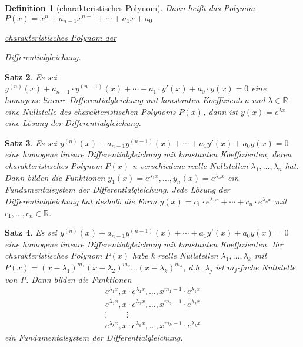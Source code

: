 \documentclass[fontset=ubuntu,11pt,a4paper,fleqn,headsepline]{scrreprt}
\newtheorem{defi}{Definition}[section]
\newtheorem{satz}[defi]{Satz}
\begin{document}
\begin{multicols}{2}
\begin{defi}[charakteristisches Polynom]
            Dann heißt das Polynom \(P(x)=x^n+a_{n-1}x^{n-1}+\cdots+a_1x+a_0\)
            
            \underline{charakteristisches Polynom der}
            
            \underline{Differentialgleichung}.
        \end{defi}
    
        \begin{satz}
            Es sei \(y^{(n)}(x) + a_{n-1} \cdot y^{(n-1)}(x) + \cdots + a_1 \cdot y'(x) + a_0 \cdot y(x) = 0\) eine homogene lineare Differentialgleichung mit konstanten Koeffizienten und \(\lambda \in\mathbb{R}\) eine Nullstelle des charakteristischen Polynoms \(P(x)\), dann ist \(y(x)=e^{\lambda x}\) eine Lösung der Differentialgleichung.
        \end{satz}
    
        \begin{satz}
            Es sei \(y^{(n)}(x) + a_{n-1} y^{(n-1)}(x) + \cdots + a_1 y'(x) + a_0 y(x) = 0\) eine homogene lineare Differentialgleichung mit konstanten Koeffizienten, deren charakteristisches Polynom \(P(x)\) n verschiedene reelle Nullstellen \(\lambda_1,\dots,\lambda_n\) hat. Dann bilden die Funktionen \(y_1(x)=e^{\lambda_1 x},\dots,y_n(x)=e^{\lambda_n x}\) ein Fundamentalsystem der Differentialgleichung. Jede Lösung der Differentialgleichung hat deshalb die Form \(y(x)=c_1 \cdot e^{\lambda_1 x} + \cdots + c_n \cdot e^{\lambda_n x}\) mit \(c_1,\dots,c_n \in \mathbb{R}\).
        \end{satz}
    
        \begin{satz}
            Es sei \(y^{(n)}(x) + a_{n-1} y^{(n-1)}(x) + \cdots + a_1 y'(x) + a_0 y(x) = 0\) eine homogene lineare Differentialgleichung mit konstanten Koeffizienten. Ihr charakteristisches Polynom \(P(x)\) habe k reelle Nullstellen \(\lambda_1,\dots,\lambda_k\) mit \(P(x)={(x-\lambda_1)}^{m_1}{(x-\lambda_2)}^{m_2} \dots {(x-\lambda_k)}^{m_k}\), d.h. \(\lambda_j\) ist \(m_j\)-fache Nullstelle von P. Dann bilden die Funktionen
            \begin{align*}
                e^{\lambda_1 x},x \cdot e^{\lambda_1 x},\dots,x^{m_1-1} \cdot e^{\lambda_1 x} \\
                e^{\lambda_2 x},x \cdot e^{\lambda_2 x},\dots,x^{m_2-1} \cdot e^{\lambda_2 x} \\
                \vdots \hspace{1cm} \vdots \hspace{1cm} \\
                e^{\lambda_k x},x \cdot e^{\lambda_k x},\dots,x^{m_k-1} \cdot e^{\lambda_k x}
            \end{align*}
            ein Fundamentalsystem der Differentialgleichung.
        \end{satz}
    

\end{multicols}
\end{document}
